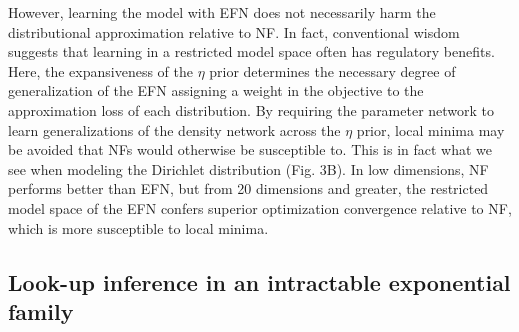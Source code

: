 \documentclass[twoside]{article}
\begin{document}
However, learning the model with EFN does not necessarily harm the distributional approximation relative to NF.  In fact, conventional wisdom suggests that learning in a restricted model space often has regulatory benefits.  Here, the expansiveness of the $\eta$ prior determines the necessary degree of generalization of the EFN assigning a weight in the objective to the approximation loss of each distribution.  By requiring the parameter network to learn generalizations of the density network across the $\eta$ prior,  local minima may be avoided that NFs would otherwise be susceptible to.  This is in fact what we see when modeling the Dirichlet distribution (Fig. 3B).  In low dimensions, NF performs better than EFN, but from 20 dimensions and greater, the restricted model space of the EFN confers superior optimization convergence relative to NF, which is more susceptible to local minima.  


\subsection{Look-up inference in an intractable exponential family}
\end{document}
